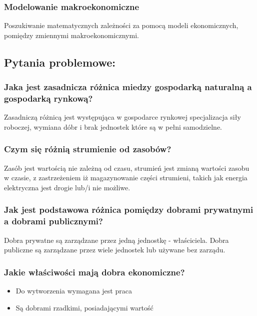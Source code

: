 \documentclass[a4paper,12pt]{article}
\begin{document}
\subsubsection*{Modelowanie makroekonomiczne}

Poszukiwanie matematycznych zależności za pomocą modeli ekonomicznych, pomiędzy zmiennymi makroekonomicznymi.

\subsection{Pytania problemowe:}

\subsubsection{Jaka jest zasadnicza różnica miedzy gospodarką naturalną a gospodarką rynkową?}

Zasadniczą różnicą jest występująca w gospodarce rynkowej specjalizacja siły roboczej, wymiana dóbr i brak jednostek które są w pełni samodzielne.

\subsubsection{Czym się różnią strumienie od zasobów?}

Zasób jest wartością nie zależną od czasu, strumień jest zmianą wartości zasobu w czasie, z zastrzeżeniem iż magazynowanie części strumieni, takich jak energia elektryczna jest drogie lub/i nie możliwe.

\subsubsection{Jak jest podstawowa różnica pomiędzy dobrami prywatnymi a dobrami publicznymi?}

Dobra prywatne są zarządzane przez jedną jednostkę - właściciela. Dobra publiczne są zarządzane przez wiele jednostek lub używane bez zarządu.

\subsubsection{Jakie właściwości mają dobra ekonomiczne?}

\begin{itemize}
	\item Do wytworzenia wymagana jest praca
	\item Są dobrami rzadkimi, posiadającymi wartość
\end{itemize}
\end{document}
